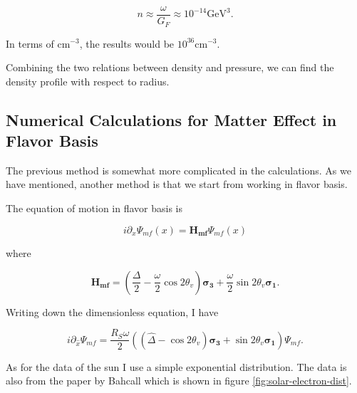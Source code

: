 \documentclass{tufte-handout}
\begin{document}
\begin{equation*}
n \approx \frac{\omega}{G_F} \approx 10^{-14} \mathrm{GeV^3} .
\end{equation*}





In terms of $\mathrm{cm^{-3}}$, the results would be $ 10^{36} \mathrm{cm^{-3}}$.

Combining the two relations between density and pressure, we can find the density profile with respect to radius.





\subsection{Numerical Calculations for Matter Effect in Flavor Basis}


The previous method is somewhat more complicated in the calculations. As we have mentioned, another method is that we start from working in flavor basis.


The equation of motion in flavor basis is

\begin{equation*}
i\partial_x \Psi_{mf}(x) = \mathbf{H_{mf}} \Psi_{mf}(x)
\end{equation*}

where 

\begin{equation*}
\mathbf{H_{mf}} =  \left(  \frac{\Delta}{2} -  \frac{\omega}{2} \cos 2\theta_v  \right) \boldsymbol{\sigma_3} + \frac{\omega}{2} \sin 2\theta_v \boldsymbol{\sigma_1}.
\end{equation*}

Writing down the dimensionless equation, I have 

\begin{equation*}
i \partial_{\hat x} \Psi_{mf} = \frac{R_S \omega}{2} ( (\hat\Delta - \cos 2\theta_v ) \boldsymbol{\sigma_3} + \sin 2\theta_v \boldsymbol{\sigma_1} )  \Psi_{mf} .
\end{equation*}


As for the data of the sun I use a simple exponential distribution. The data is also from the paper by Bahcall which is shown in figure \ref{fig:solar-electron-dist}.
\end{document}
